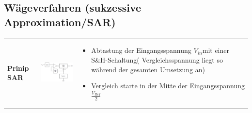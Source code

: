 \subsection{Wägeverfahren (sukzessive Approximation/SAR) }
\begin{longtable}{|>{\bfseries}p{4cm}|p{6cm}|p{8cm}|}
  \hline
    Prinip SAR &
    \includegraphics[width=6cm, valign=t]{pictures/waegeverfahren} &
    \begin{itemize}
      \item Abtastung der Eingangsspannung $V_{in}$mit einer
          S\&H-Schaltung( Vergleichsspannung liegt so während der gesamten
        Umsetzung an)
      \item Vergleich starte in der Mitte der Eingangsspannung $\frac{V_{Ref}}{2}$
    \end{itemize} \\
    

\end{longtable}
